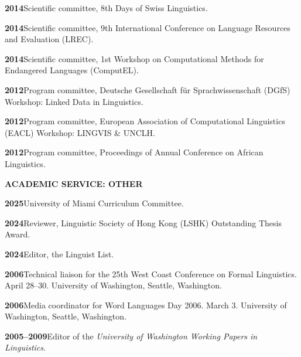 \documentclass[11pt]{article}
\newcommand{\hangpara}{
 \setlength{\parindent}{0in} %
 \hangindent=0.42in %
}
\begin{document}
\vskip 6pt
\hangpara
{\bf 2014}\hspace{1ex}Scientific committee, 8th Days of Swiss Linguistics.

\vskip 6pt
\hangpara
{\bf 2014}\hspace{1ex}Scientific committee, 9th International Conference on Language Resources and Evaluation (LREC).

\vskip 6pt
\hangpara
{\bf 2014}\hspace{1ex}Scientific committee, 1st Workshop on Computational Methods for Endangered Languages (ComputEL).

\vskip 6pt
\hangpara
{\bf 2012}\hspace{1ex}Program committee, Deutsche Gesellschaft f{\"u}r Sprachwissenschaft (DGfS) Workshop: Linked Data in Linguistics.

\vskip 6pt
\hangpara
{\bf 2012}\hspace{1ex}Program committee, European Association of Computational Linguistics (EACL) Workshop: LINGVIS \& UNCLH.

\vskip 6pt
\hangpara
{\bf 2012}\hspace{1ex}Program committee, Proceedings of Annual Conference on African Linguistics.


\vskip 20pt
\begin{flushleft}
{\bf ACADEMIC SERVICE: OTHER}
\end{flushleft}

\hangpara
{\bf 2025}\hspace{1ex}University of Miami Curriculum Committee.

\vskip 6pt
\hangpara
{\bf 2024}\hspace{1ex}Reviewer, Linguistic Society of Hong Kong (LSHK) Outstanding Thesis Award.

\vskip 6pt
\hangpara
{\bf 2024}\hspace{1ex}Editor, the Linguist List.

\vskip 6pt
\hangpara
{\bf 2006}\hspace{1ex}Technical liaison for the 25th West Coast Conference on Formal Linguistics. April 28--30. University of Washington, Seattle, Washington.

\vskip 6pt
\hangpara
{\bf 2006}\hspace{1ex}Media coordinator for Word Languages Day 2006. March 3. University of Washington, Seattle, Washington.	

\vskip 6pt
\hangpara
{\bf 2005--2009}\hspace{1ex}Editor of the \textit{University of Washington Working Papers in Linguistics}.
\end{document}
